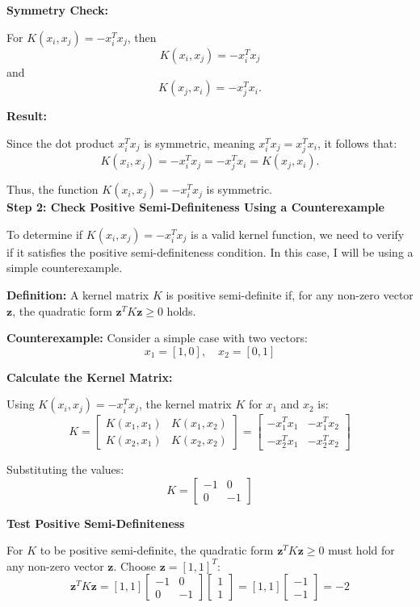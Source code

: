 \documentclass[11pt]{article}
\begin{document}
\begin{enumerate}
\textbf{Symmetry Check:}

   For \( K(x_i, x_j) = -x_i^T x_j \), then
   \[
   K(x_i, x_j) = -x_i^T x_j
   \]
   and
   \[
   K(x_j, x_i) = -x_j^T x_i.
   \]

\textbf{Result:}

   Since the dot product \( x_i^T x_j \) is symmetric, meaning \( x_i^T x_j = x_j^T x_i \), it follows that:
   \[
   K(x_i, x_j) = -x_i^T x_j = -x_j^T x_i = K(x_j, x_i).
   \]

Thus, the function \( K(x_i, x_j) = -x_i^T x_j \) is symmetric.\\

\textbf{Step 2: Check Positive Semi-Definiteness Using a Counterexample}

To determine if \( K(x_i, x_j) = -x_i^T x_j \) is a valid kernel function, we need to verify if it satisfies the positive semi-definiteness condition. In this case, I will be using a simple counterexample.

\textbf{Definition:} A kernel matrix \( K \) is positive semi-definite if, for any non-zero vector \( \mathbf{z} \), the quadratic form \( \mathbf{z}^T K \mathbf{z} \geq 0 \) holds.

\textbf{Counterexample:} Consider a simple case with two vectors:
   \[
   x_1 = [1, 0], \quad x_2 = [0, 1]
   \]

\textbf{Calculate the Kernel Matrix:}

   Using \( K(x_i, x_j) = -x_i^T x_j \), the kernel matrix \( K \) for \( x_1 \) and \( x_2 \) is:
   \[
   K = \begin{bmatrix}
   K(x_1, x_1) & K(x_1, x_2) \\
   K(x_2, x_1) & K(x_2, x_2)
   \end{bmatrix} = \begin{bmatrix}
   -x_1^T x_1 & -x_1^T x_2 \\
   -x_2^T x_1 & -x_2^T x_2
   \end{bmatrix}
   \]

   Substituting the values:
   \[
   K = \begin{bmatrix}
   -1 & 0 \\
   0 & -1
   \end{bmatrix}
   \]

\textbf{Test Positive Semi-Definiteness}

   For \( K \) to be positive semi-definite, the quadratic form \( \mathbf{z}^T K \mathbf{z} \geq 0 \) must hold for any non-zero vector \( \mathbf{z} \). Choose \( \mathbf{z} = [1, 1]^T \):
   \[
   \mathbf{z}^T K \mathbf{z} = [1, 1] \begin{bmatrix} -1 & 0 \\ 0 & -1 \end{bmatrix} \begin{bmatrix} 1 \\ 1 \end{bmatrix} = [1, 1] \begin{bmatrix} -1 \\ -1 \end{bmatrix} = -2
   \]


\end{enumerate}
\end{document}
